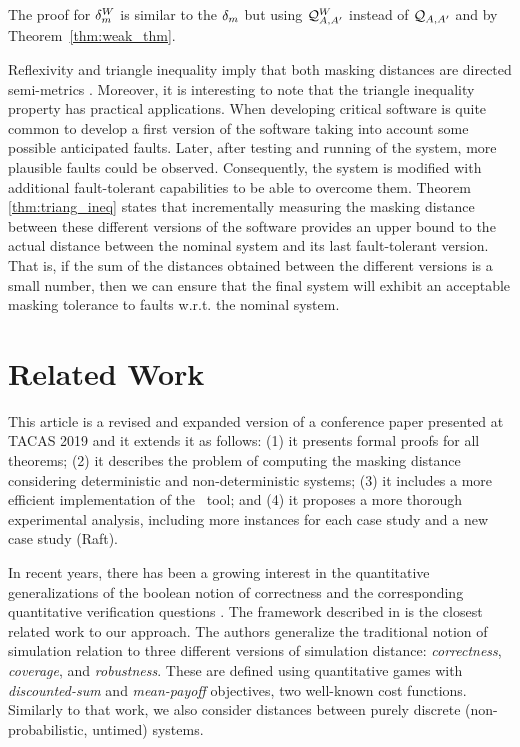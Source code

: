 The proof for $\delta_{m}^W$ is similar to the $\delta_{m}$ 
but using $\mathcal{Q}^W_{A,A'}$ instead of $\mathcal{Q}_{A, A'}$ and by Theorem~\ref{thm:weak_thm}.

Reflexivity and  triangle inequality imply that both masking distances are directed semi-metrics \cite{CharikarMM06,AlfaroMRS08}.  Moreover, it is interesting to note that the triangle inequality property has practical applications. When developing critical software is quite common to develop a first version of the software taking into account some possible anticipated faults. 
Later, after testing and running of the system, more plausible faults could be observed. 
Consequently, the system is modified with additional fault-tolerant capabilities to be able 
to overcome them. 
Theorem \ref{thm:triang_ineq} states that incrementally measuring the masking distance between these different versions of the software provides an upper bound to the actual distance between the nominal system and its last fault-tolerant version. That is, if the sum of the distances obtained between the different versions is a small number, then we can ensure that the final system will 
exhibit an acceptable masking tolerance to faults w.r.t. the nominal system.





\section{Related Work} \label{sec:related_work}

This article is a revised and expanded version of a conference paper presented at 
TACAS 2019 \cite{CastroDDP18b} and it extends it as follows:  
(1) it presents formal proofs for all theorems; (2) it describes the problem of computing  
the masking distance considering deterministic and 
non-deterministic systems; (3) it includes a more efficient implementation 
of the \MaskD~tool; and (4) it proposes a more thorough experimental analysis, including more 
instances for each case study and a new case study (Raft).

In recent years, there has been a growing interest in the quantitative 
generalizations of the boolean notion of correctness and the 
corresponding quantitative verification questions \cite{BokerCHK14,CernyHR12,Henzinger10,Henzinger13}.
The framework described in \cite{CernyHR12} is the closest related work to our approach. 
The authors generalize the traditional notion of 
simulation relation to three different versions of simulation distance: \emph{correctness}, \emph{coverage}, and \emph{robustness}.
These are defined using quantitative games with \emph{discounted-sum} 
and \emph{mean-payoff} objectives, two well-known cost functions.
Similarly to that work, we also consider distances between purely 
discrete (non-probabilistic, untimed) systems.


